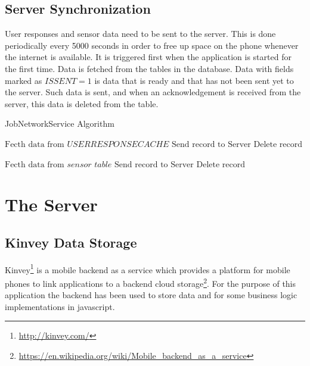 \subsection{Server Synchronization} \label{job}

User responses and sensor data need to be sent to the server. This is done periodically every 5000 seconds in order to free up space on the phone whenever the internet is available. It is triggered first when the application is started for the first time. Data is fetched from the tables in the database. Data with fields marked as $\textit{ISSENT}=1$ is data that is ready and that has not been sent yet to the server. Such data is sent, and when an acknowledgement is received from the server, this data is deleted from the table.

\begin{algorithm}
\caption{JobNetworkService Algorithm}\label{nextday}
\begin{algorithmic}[1]
\State $ \text{Fecth data from } \textit{USERRESPONSECACHE}$
  \State $\text{Send record to Server}$
  \State $\text{Delete record}$  
  \EndIf
  \EndIf
 	\EndFor

 	 \State $ \text{Fecth data from } \textit{sensor table}$
  \State $\text{Send record to Server}$
  \State $\text{Delete record}$  
  \EndIf
  \EndIf
 	\EndFor
	
 	\EndFor
\EndProcedure
\end{algorithmic}
\end{algorithm}



\section{The Server}

\subsection{Kinvey Data Storage}

Kinvey\footnote{\url{http://kinvey.com/}} is a mobile backend as a service which provides a platform for mobile phones to link applications to a backend cloud storage\footnote{\url{https://en.wikipedia.org/wiki/Mobile_backend_as_a_service}}. For the purpose of this application the backend has been used to store data and for some business logic implementations in javascript.

